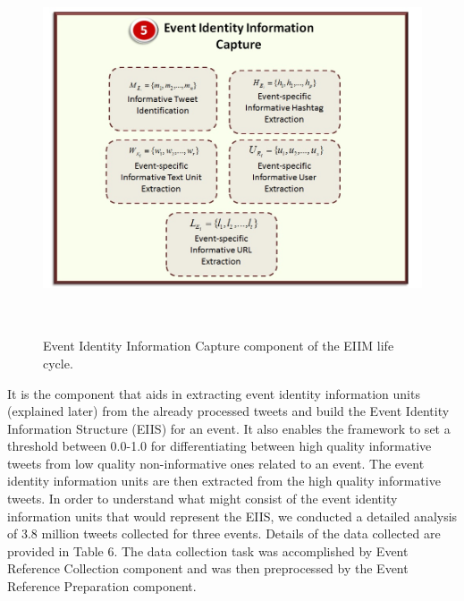 \begin{figure}[htbp]
  \caption{Event Identity Information Capture component of the EIIM life cycle.}
  \centering
    \includegraphics[width=14cm,height=11cm]{Figures/EIIMComponents/EventIdentityInformationCapture.jpg}
\end{figure}

It is the component that aids in extracting event identity information units (explained later) from the already processed tweets and build the Event Identity Information Structure (EIIS) for an event. It also enables the framework to set a threshold between 0.0-1.0 for differentiating between high quality informative tweets from low quality non-informative ones related to an event. The event identity information units are then extracted from the high quality informative tweets. 
In order to understand what might consist of the event identity information units that would represent the EIIS, we conducted a detailed analysis of 3.8 million tweets collected for three events. Details of the data collected are provided in Table 6. The data collection task was accomplished by Event Reference Collection component and was then preprocessed by the Event Reference Preparation component.

